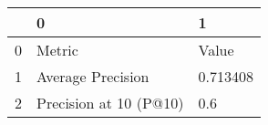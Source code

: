 \begin{tabular}{lll}
\toprule
{} &                       0 &         1 \\
\midrule
0 &                  Metric &     Value \\
1 &       Average Precision &  0.713408 \\
2 &  Precision at 10 (P@10) &       0.6 \\
\bottomrule
\end{tabular}
